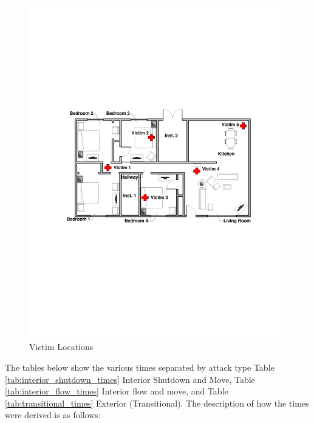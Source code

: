 \documentclass[12pt,oneside]{book}
\begin{document}
\begin{figure}[H]
	\includegraphics[width=.75\textheight]{../0_Images/Instrumentation/Victim_Locations_New}
	\caption{Victim Locations}
	\label{fig:victims}
\end{figure}

The tables below show the various times separated by attack type Table \ref{tab:interior_shutdown_times} Interior Shutdown and Move, Table \ref{tab:interior_flow_times} Interior flow and move, and Table \ref{tab:transitional_times} Exterior (Transitional). The description of how the times were derived is as follows:
\end{document}
